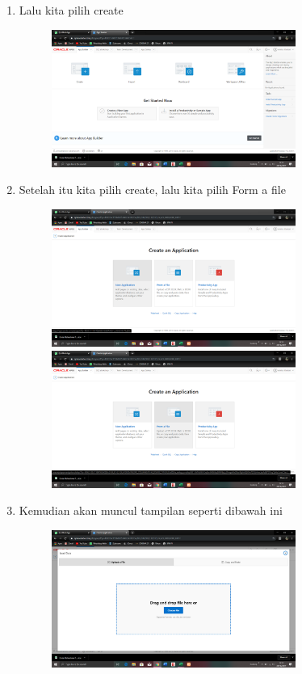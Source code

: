 \documentclass{article}
\begin{document}
\begin{enumerate}
\begin{figure}[h]
            \end{figure}
    \item Lalu kita pilih create
        \begin{figure}[h]
            \centerline{\includegraphics[width=8cm]{image/4.png}}
            \end{figure}
    \newpage \item Setelah itu kita pilih create, lalu kita pilih Form a file
        \begin{figure}[h]
            \centerline{\includegraphics[width=8cm]{image/5.png}}
            \centerline{\includegraphics[width=8cm]{image/6.png}}
            \end{figure}
    \item Kemudian akan muncul tampilan seperti dibawah ini
        \begin{figure}[h]
           \centerline{\includegraphics[width=8cm]{image/7.png}}

\end{figure}
\end{enumerate}
\end{document}
